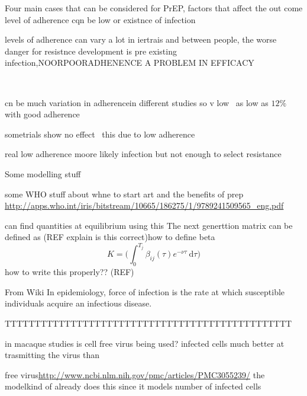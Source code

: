 \documentclass[DIV=15]{scrartcl}
\begin{document}
 








 Four main cases that can be considered for PrEP, factors that affect the out come level of adherence     cqn be low or existnce of infection
 
 levels of adherence can vary a  lot in iertrais and between people, the worse danger for resistnce development is pre existing infection,NOORPOORADHENENCE A PROBLEM IN EFFICACY
 
 ~\cite{vanderstraten2012}
 
 cn be much variation in adherencein different studies so v low~\cite{corneli2014} as low as $12\%$ with good adherence
 
 
 sometrials show no effect~\cite{vandamme2012} this due to low adherence
 
 real low adherence moore likely infection but not enough to select resistance
  
  Some modelling stuff \cite{diekmann1990}
  
  
  
  some WHO stuff about whne to start art and  the benefits of prep
  \url{http://apps.who.int/iris/bitstream/10665/186275/1/9789241509565_eng.pdf}
  
  
can find quantities at equilibrium using this   
  The next generttion  matrix can be defined as (REF explain is this  correct)how to define beta
  \begin{equation}
   K = \big( \int_0^{T_j}\beta_{ij}(\tau) e^{-\nu \tau} \ \text{d} \tau \big)
  \end{equation}
how to write this properly??  (REF)

From Wiki
  In epidemiology, force of infection  is the rate at which susceptible individuals acquire an infectious disease.
  
  
  
  











TTTTTTTTTTTTTTTTTTTTTTTTTTTTTTTTTTTTTTTTTTTTTTTT

in macaque studies is cell  free virus being used?
infected cells much better at trasmitting the virus than 

free virus\url{http://www.ncbi.nlm.nih.gov/pmc/articles/PMC3055239/}  the modelkind of already does this since it models number of infected cells
\end{document}
